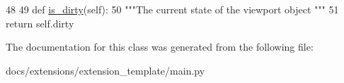\begin{DoxyCode}
48 
49     \textcolor{keyword}{def }\hyperlink{classmain_1_1ViewPort_a5652106d953c961d92bf96b32e4130b0}{is\_dirty}(self):
50         \textcolor{stringliteral}{"""The current state of the viewport object """}
51         \textcolor{keywordflow}{return} self.dirty
        
\end{DoxyCode}


The documentation for this class was generated from the following file\-:\begin{DoxyCompactItemize}
\item 
docs/extensions/extension\-\_\-template/main.\-py\end{DoxyCompactItemize}
